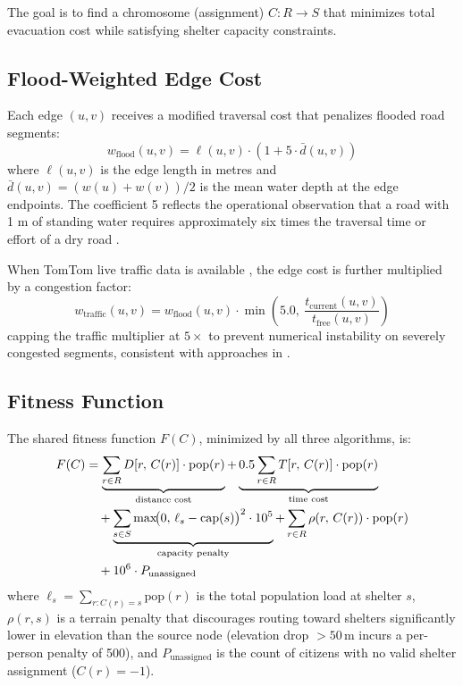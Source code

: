 \documentclass[journal]{IEEEtran}
\begin{document}
The goal is to find a chromosome (assignment) $C: R \to S$ that minimizes total evacuation
cost while satisfying shelter capacity constraints.

\subsection{Flood-Weighted Edge Cost}

Each edge $(u, v)$ receives a modified traversal cost that penalizes flooded road segments:
\begin{equation}
  w_{\text{flood}}(u,v) = \ell(u,v) \cdot \left(1 + 5 \cdot \bar{d}(u,v)\right)
  \label{eq:flood_weight}
\end{equation}
where $\ell(u,v)$ is the edge length in metres and
$\bar{d}(u,v) = (w(u) + w(v)) / 2$ is the mean water depth at the edge endpoints.
The coefficient 5 reflects the operational observation that a road with 1 m of standing
water requires approximately six times the traversal time or effort of a dry road
\cite{behrooz2024adaptive}.

When TomTom live traffic data is available \cite{tomtom2024}, the edge cost is further
multiplied by a congestion factor:
\begin{equation}
  w_{\text{traffic}}(u,v) = w_{\text{flood}}(u,v) \cdot
  \min\!\left(5.0,\ \frac{t_{\text{current}}(u,v)}{t_{\text{free}}(u,v)}\right)
  \label{eq:traffic_weight}
\end{equation}
capping the traffic multiplier at $5\times$ to prevent numerical instability on severely
congested segments, consistent with approaches in \cite{wang2024congestion}.

\subsection{Fitness Function}

The shared fitness function $F(C)$, minimized by all three algorithms, is:
\begin{align}
  F(C) &= \underbrace{\sum_{r \in R} D[r,\, C(r)] \cdot \text{pop}(r)}_{\text{distance cost}}
         + \underbrace{0.5 \sum_{r \in R} T[r,\, C(r)] \cdot \text{pop}(r)}_{\text{time cost}}
         \notag \\
       &\quad + \underbrace{\sum_{s \in S} \max\!\bigl(0,\, \ell_s - \text{cap}(s)\bigr)^2
                           \cdot 10^5}_{\text{capacity penalty}}
         + \sum_{r \in R} \rho(r,\, C(r)) \cdot \text{pop}(r)
         \notag \\
       &\quad + 10^6 \cdot P_{\text{unassigned}}
         \label{eq:fitness}
\end{align}
where $\ell_s = \sum_{r: C(r)=s} \text{pop}(r)$ is the total population load at shelter
$s$, $\rho(r, s)$ is a terrain penalty that discourages routing toward shelters
significantly lower in elevation than the source node (elevation drop $> 50\,\text{m}$
incurs a per-person penalty of 500), and $P_{\text{unassigned}}$ is the count of citizens
with no valid shelter assignment ($C(r) = -1$).
\end{document}
